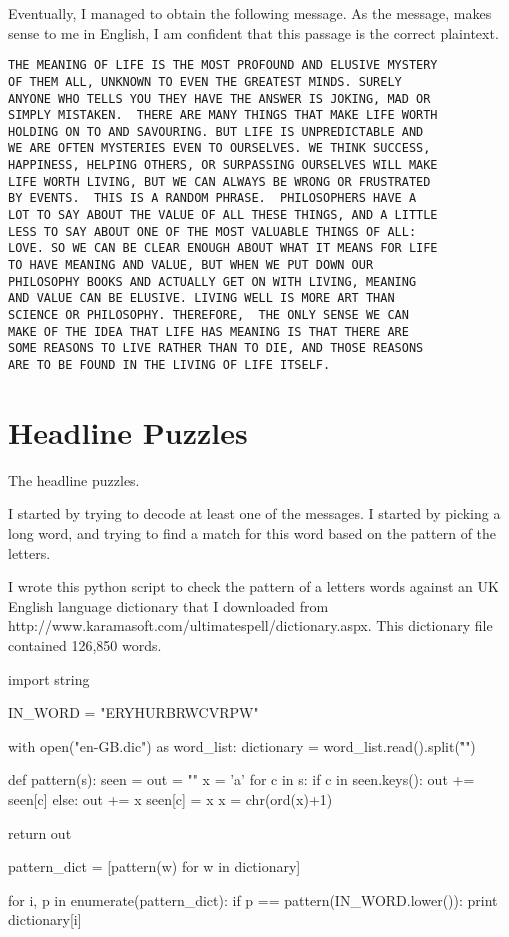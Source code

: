 \documentclass[12pt,a4paper,twoside]{article}
\begin{document}
Eventually, I managed to obtain the following message. As the message, makes
sense to me in English, I am confident that this passage is the correct
plaintext. 

\begin{lstlisting}
THE MEANING OF LIFE IS THE MOST PROFOUND AND ELUSIVE MYSTERY
OF THEM ALL, UNKNOWN TO EVEN THE GREATEST MINDS. SURELY
ANYONE WHO TELLS YOU THEY HAVE THE ANSWER IS JOKING, MAD OR
SIMPLY MISTAKEN.  THERE ARE MANY THINGS THAT MAKE LIFE WORTH
HOLDING ON TO AND SAVOURING. BUT LIFE IS UNPREDICTABLE AND
WE ARE OFTEN MYSTERIES EVEN TO OURSELVES. WE THINK SUCCESS,
HAPPINESS, HELPING OTHERS, OR SURPASSING OURSELVES WILL MAKE
LIFE WORTH LIVING, BUT WE CAN ALWAYS BE WRONG OR FRUSTRATED
BY EVENTS.  THIS IS A RANDOM PHRASE.  PHILOSOPHERS HAVE A
LOT TO SAY ABOUT THE VALUE OF ALL THESE THINGS, AND A LITTLE
LESS TO SAY ABOUT ONE OF THE MOST VALUABLE THINGS OF ALL:
LOVE. SO WE CAN BE CLEAR ENOUGH ABOUT WHAT IT MEANS FOR LIFE
TO HAVE MEANING AND VALUE, BUT WHEN WE PUT DOWN OUR
PHILOSOPHY BOOKS AND ACTUALLY GET ON WITH LIVING, MEANING
AND VALUE CAN BE ELUSIVE. LIVING WELL IS MORE ART THAN
SCIENCE OR PHILOSOPHY. THEREFORE,  THE ONLY SENSE WE CAN
MAKE OF THE IDEA THAT LIFE HAS MEANING IS THAT THERE ARE
SOME REASONS TO LIVE RATHER THAN TO DIE, AND THOSE REASONS
ARE TO BE FOUND IN THE LIVING OF LIFE ITSELF.
\end{lstlisting}


\section{Headline Puzzles}
The headline puzzles.

I started by trying to decode at least one of the messages. I started by
picking a long word, and trying to find a match for this word based on the
pattern of the letters. 

I wrote this python script to check the pattern of a letters words against an
UK English language dictionary that I downloaded from
http://www.karamasoft.com/ultimatespell/dictionary.aspx. This dictionary file
contained 126,850 words. 

\begin{python}
import string 

IN_WORD = "ERYHURBRWCVRPW"

with open("en-GB.dic") as word_list:
    dictionary = word_list.read().split("\r\n")

def pattern(s):
    seen = {}
    out = ""
    x = 'a'
    for c in s:
        if c in seen.keys():
            out += seen[c]
        else:
            out += x
            seen[c] = x
            x = chr(ord(x)+1)

    return out

pattern_dict = [pattern(w) for w in dictionary]

for i, p in enumerate(pattern_dict):
    if p == pattern(IN_WORD.lower()):
        print dictionary[i]

\end{python}
\end{document}
